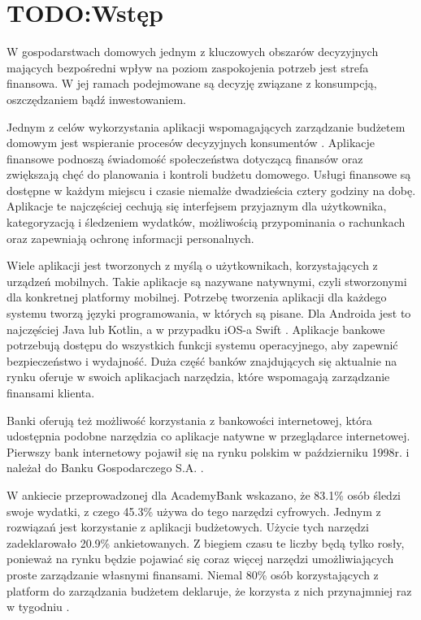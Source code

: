 \chapter{TODO:Wstęp}
W gospodarstwach domowych jednym z kluczowych obszarów decyzyjnych mających bezpośredni wpływ na poziom zaspokojenia potrzeb jest strefa finansowa. W jej ramach podejmowane są decyzję związane z konsumpcją, oszczędzaniem bądź inwestowaniem.

Jednym z celów wykorzystania aplikacji wspomagających zarządzanie budżetem domowym jest wspieranie procesów decyzyjnych konsumentów \cite{Robo-Advisory}. Aplikacje finansowe podnoszą świadomość społeczeństwa dotyczącą finansów oraz zwiększają chęć do planowania i kontroli budżetu domowego. Usługi finansowe są dostępne w każdym miejscu i czasie niemalże dwadzieścia cztery godziny na dobę. Aplikacje te najczęściej cechują się interfejsem przyjaznym dla użytkownika, kategoryzacją i śledzeniem wydatków, możliwością przypominania o rachunkach oraz zapewniają ochronę informacji personalnych.

Wiele aplikacji jest tworzonych z myślą o użytkownikach, korzystających z urządzeń mobilnych. Takie aplikacje są nazywane natywnymi, czyli stworzonymi dla konkretnej platformy mobilnej. Potrzebę tworzenia aplikacji dla każdego systemu tworzą języki programowania, w których są pisane. Dla Androida jest to najczęściej Java lub Kotlin, a w przypadku iOS-a Swift \cite{native}. Aplikacje bankowe potrzebują dostępu do wszystkich funkcji systemu operacyjnego, aby zapewnić bezpieczeństwo i wydajność. Duża część banków znajdujących się aktualnie na rynku oferuje w swoich aplikacjach narzędzia, które wspomagają zarządzanie finansami klienta. 

Banki oferują też możliwość korzystania z bankowości internetowej, która udostępnia podobne narzędzia co aplikacje natywne w przeglądarce internetowej. Pierwszy bank internetowy pojawił się na rynku polskim w październiku 1998r. i należał do Banku Gospodarczego S.A. \cite{bankowoscinternetowa}.

W ankiecie przeprowadzonej dla AcademyBank wskazano, że 83.1\% osób śledzi swoje wydatki, z czego 45.3\% używa do tego narzędzi cyfrowych. Jednym z rozwiązań jest korzystanie z aplikacji budżetowych. Użycie tych narzędzi zadeklarowało 20.9\% ankietowanych. Z biegiem czasu te liczby będą tylko rosły, ponieważ na rynku będzie pojawiać się coraz więcej narzędzi umożliwiających proste zarządzanie własnymi finansami. Niemal 80\% osób korzystających z platform do zarządzania budżetem deklaruje, że korzysta z nich przynajmniej raz w tygodniu \cite{AcademyBank}.

